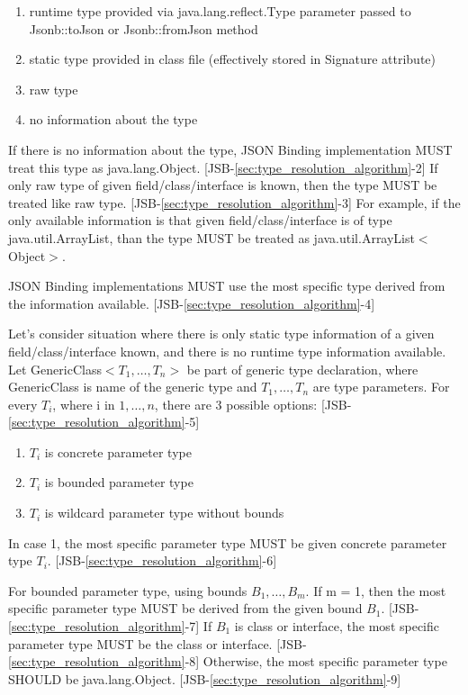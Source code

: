 \begin{enumerate}
	\item runtime type provided via java.lang.reflect.Type parameter passed to Jsonb::toJson or Jsonb::fromJson method
	\item static type provided in class file (effectively stored in Signature attribute)
	\item raw type
	\item no information about the type
\end{enumerate}

If there is no information about the type, JSON Binding implementation MUST treat this type as java.lang.Object. [JSB-\ref{sec:type_resolution_algorithm}-2]
If only raw type of given field/class/interface is known, then the type MUST be treated like raw type. [JSB-\ref{sec:type_resolution_algorithm}-3] For example, if the only available information is that given field/class/interface is of type java.util.ArrayList, than the type MUST be treated as java.util.ArrayList\(<\)Object\(>\).

JSON Binding implementations MUST use the most specific type derived from the information available. [JSB-\ref{sec:type_resolution_algorithm}-4]

Let's consider situation where there is only static type information of a given field/class/interface known, and there is no runtime type information available. Let GenericClass\(<T_1,\dotsc,T_n>\) be part of generic type declaration, where GenericClass is name of the generic type and \(T_1,\dotsc,T_n\) are type parameters. For every \(T_i\), where i in \(1,\dotsc,n\), there are 3 possible options: [JSB-\ref{sec:type_resolution_algorithm}-5]

\begin{enumerate}
	\item \(T_i\) is concrete parameter type
	\item \(T_i\) is bounded parameter type
	\item \(T_i\) is wildcard parameter type without bounds
\end{enumerate}

In case 1, the most specific parameter type MUST be given concrete parameter type \(T_i\). [JSB-\ref{sec:type_resolution_algorithm}-6]

For bounded parameter type, using bounds \(B_1,\dotsc,B_m\). If m = 1, then the most specific parameter type MUST be derived from the given bound \(B_1\). [JSB-\ref{sec:type_resolution_algorithm}-7] If \(B_1\) is class or interface, the most specific parameter type MUST be the class or interface. [JSB-\ref{sec:type_resolution_algorithm}-8] Otherwise, the most specific parameter type SHOULD be java.lang.Object. [JSB-\ref{sec:type_resolution_algorithm}-9]

